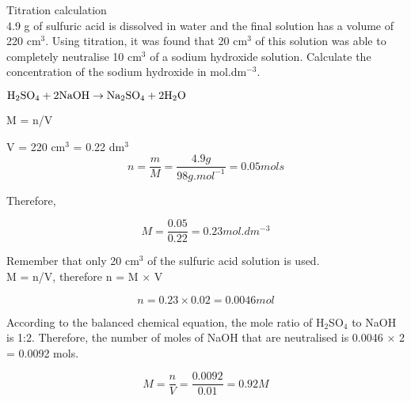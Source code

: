 \begin{wex}{Titration calculation\\}{
4.9 g of sulfuric acid is dissolved in water and the final solution has a volume of 220 cm$^{3}$. Using titration, it was found that 20 cm$^{3}$ of this solution was able to completely neutralise 10 cm$^{3}$ of a sodium hydroxide solution. Calculate the concentration of the sodium hydroxide in mol.dm$^{-3}$.
}

{

$\rm{H_{2}SO_{4} + 2NaOH \rightarrow Na_{2}SO_{4} + 2H_{2}O}$\\
}

{

M = n/V

V = 220 cm$^{3}$ = 0.22 dm$^{3}$\\

\begin{equation*}
n = \frac{m}{M} = \frac{4.9 g}{98 g.mol^{-1}} = 0.05 mols
\end{equation*}

Therefore,

\begin{equation*}
M = \frac{0.05}{0.22} = 0.23 mol.dm^{-3}
\end{equation*}
}

{

Remember that only 20 cm$^{3}$ of the sulfuric acid solution is used.\\

M = n/V, therefore n = M $\times$ V

\begin{equation*}
n = 0.23 \times 0.02 = 0.0046 mol
\end{equation*}
}

{

According to the balanced chemical equation, the mole ratio of H$_{2}$SO$_{4}$ to NaOH is 1:2. Therefore, the number of moles of NaOH that are neutralised is 0.0046 $\times$ 2 = 0.0092 mols.\\
}

{

\begin{equation*}
M = \frac{n}{V} = \frac{0.0092}{0.01} = 0.92 M
\end{equation*}
}

\end{wex}

